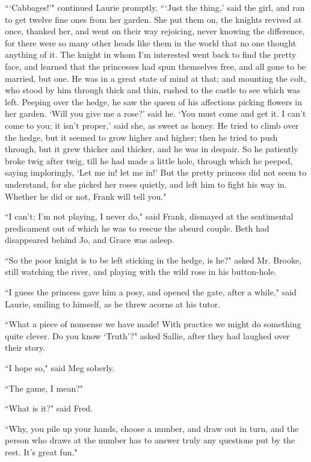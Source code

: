 ```Cabbages!'" continued Laurie promptly.
```Just the thing,' said the girl, and
ran to get twelve fine ones from her garden. She put them on, the
knights revived at once, thanked her, and went on their way rejoicing,
never knowing the difference, for there were so many other heads like
them in the world that no one thought anything of it. The knight in whom
I'm interested went back to find the pretty face, and
learned that the princesses had spun themselves free, and all gone to be
married, but one. He was in a great state of mind at that; and mounting
the colt, who stood by him through thick and thin, rushed to the castle
to see which was left. Peeping over the hedge, he saw the queen of his
affections picking flowers in her garden. `Will you give
me a rose?' said he. `You must come and
get it. I can't come to you; it isn't
proper,' said she, as sweet as honey. He tried to climb
over the hedge, but it seemed to grow higher and higher; then he tried
to push through, but it grew thicker and thicker, and he was in despair.
So he patiently broke twig after twig, till he had made a little hole,
through which he peeped, saying imploringly, `Let me in!
let me in!' But the pretty princess did not seem to
understand, for she picked her roses quietly, and left him to fight his
way in. Whether he did or not, Frank will tell you."

``I can't; I'm not playing, I never do,"
said Frank, dismayed at the sentimental predicament out of which he was
to rescue the absurd couple. Beth had disappeared behind Jo, and Grace
was asleep.

``So the poor knight is to be left sticking in the hedge, is he?" asked
Mr. Brooke, still watching the river, and playing with the wild rose in
his button-hole.

``I guess the princess gave him a posy, and opened the gate, after a
while," said Laurie, smiling to himself, as he threw acorns at his
tutor.

``What a piece of nonsense we have made! With practice we might do
something quite clever. Do you know
`Truth'?" asked Sallie, after they had
laughed over their story.

``I hope so," said Meg soberly.

``The game, I mean?"

``What is it?" said Fred.

``Why, you pile up your hands, choose a number, and draw out in turn, and
the person who draws at the number has to answer truly any questions put
by the rest. It's great fun."

